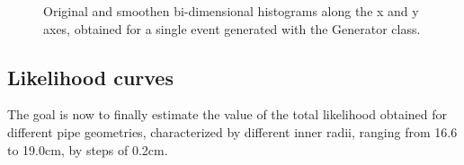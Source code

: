 \documentclass[a4paper, 11pt, twoside, openright]{report}
\begin{document}
\begin{figure}[htbp]
\begin{center}
\caption{Original and smoothen bi-dimensional histograms along the x and y axes, obtained for a single event generated with the Generator class.}
\label{fig:KDFresults}
\end{center}
\end{figure}

\subsection{Likelihood curves}

The goal is now to finally estimate the value of the total likelihood obtained for different pipe geometries, characterized by different inner radii, ranging from 16.6 to 19.0cm, by steps of 0.2cm.
\end{document}
